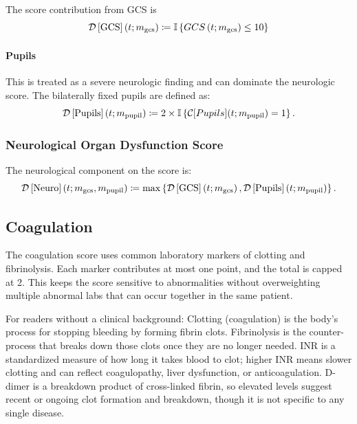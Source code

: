 \documentclass[letterpaper,10pt]{article}
\begin{document}
The score contribution from GCS is
\begin{equation}
  \label{eq:gcscontribution}
  \DS{GCS}[\m{gcs}] \coloneqq \mathbb{I}\left\{ GCS\left(t; \m{gcs}\right) \leq 10\right\}
\end{equation}

\paragraph{Pupils}
This is treated as a severe
neurologic finding and can dominate the neurologic score.
The bilaterally fixed pupils are defined as:
\begin{equation}
  \label{eq:pupils}
  \DS{Pupils}[\m{pupil}] \coloneqq 2 \times \mathbb{I}\left\{\mathcal{C}[Pupils](t;\m{pupil}) = 1\right\}.
\end{equation}

\subsubsection{Neurological Organ Dysfunction Score}\label{sec:neuro-odss}

The neurological component on the score is:
\begin{equation}
  \label{eq:neuro}
  \DS{Neuro}[\m{gcs}, \m{pupil}] \coloneqq
  \max \left\{ \DS{GCS}[\m{gcs}],
  \DS{Pupils}[\m{pupil}] \right\}.
\end{equation}

\subsection{Coagulation}\label{sec:coag}

The coagulation score uses common laboratory markers of clotting and
fibrinolysis. Each marker contributes at most one point, and the total
is capped at 2. This keeps the score sensitive to abnormalities without
overweighting multiple abnormal labs that can occur together in the same
patient.

For readers without a clinical background: Clotting (coagulation) is the
body's process for stopping bleeding by forming fibrin clots.
Fibrinolysis is the counter-process that breaks down those clots once
they are no longer needed. INR is a standardized measure of how long it
takes blood to clot; higher INR means slower clotting and can reflect
coagulopathy, liver dysfunction, or anticoagulation. D-dimer is a
breakdown product of cross-linked fibrin, so elevated levels suggest
recent or ongoing clot formation and breakdown, though it is not
specific to any single disease.
\end{document}
